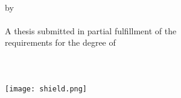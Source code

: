 \begin{titlepage}
	\setcounter{page}{1}
	\onehalfspacing
    \begin{center}
    	\MTcover
        \vspace*{\coverSkip}
        
        \CAPTitle\\
		\vspace{2em}
		by\\
        \Author \\  
      	\vspace{2em}
        A thesis submitted in partial fulfillment of the\\ 
        requirements for the degree of\\
		\vspace{2em}
        \Degree\\
        \vspace{2em}
        \vspace{6em}
        \University\\
        \Year\\
        \vspace{.5em}
        \texttt{[image: shield.png]}
    \end{center}
\end{titlepage}